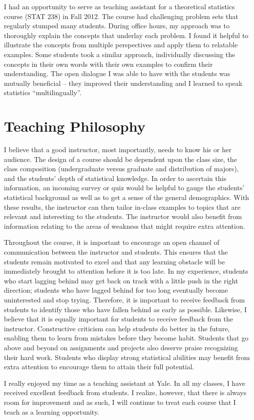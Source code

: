 \documentclass[11pt]{article}
\begin{document}
I had an opportunity to serve as teaching assistant for a theoretical statistics course (STAT 238) in Fall 2012. The course had challenging problem sets that regularly stumped many students. During office hours, my approach was to thoroughly explain the concepts that underlay each problem. I found it helpful to illustrate the concepts from multiple perspectives and apply them to relatable examples. Some students took a similar approach, individually discussing the concepts in their own words with their own examples to confirm their understanding. The open dialogue I was able to have with the students was mutually beneficial -- they improved their understanding and I learned to speak statistics ``multilingually''.

\section{Teaching Philosophy} %
\label{sec:teaching_philosophy}
I believe that a good instructor, most importantly, needs to know his or her audience. The design of a course should be dependent upon the class size, the class composition (undergraduate versus graduate and distribution of majors), and the students' depth of statistical knowledge. In order to ascertain this information, an incoming survey or quiz would be helpful to gauge the students' statistical background as well as to get a sense of the general demographics. With these results, the instructor can then tailor in-class examples to topics that are relevant and interesting to the students. The instructor would also benefit from information relating to the areas of weakness that might require extra attention.

Throughout the course, it is important to encourage an open channel of communication between the instructor and students. This ensures that the students remain motivated to excel and that any learning obstacle will be immediately brought to attention before it is too late. In my experience, students who start lagging behind may get back on track with
a little push in the right direction; students who have lagged behind for too long eventually become uninterested and stop trying. Therefore, it is important to receive feedback from students to identify those who have fallen behind as early as possible. Likewise, I believe that it is equally important for students to receive feedback from the instructor. Constructive criticism can help students do better in the future, enabling them to learn from mistakes before they become habit. Students that go above and beyond on assignments and projects also deserve praise recognizing their hard work. Students who display strong statistical abilities may benefit from extra attention to encourage them to attain their full potential.

I really enjoyed my time as a teaching assistant at Yale. In all my classes, I have received excellent feedback from students. I realize, however, that there is always room for improvement and as such, I will continue to treat each course that I teach as a learning opportunity.  
\end{document}

